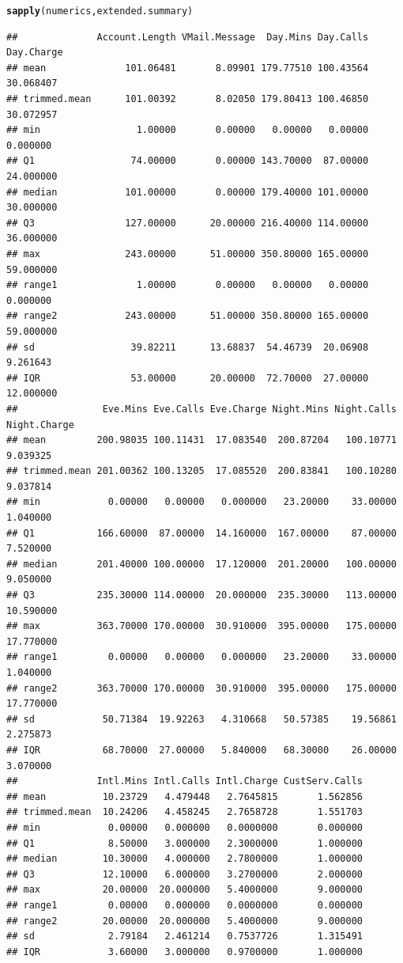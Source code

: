 \documentclass{article}\usepackage[]{graphicx}\usepackage[]{color}
\makeatletter
\newcommand{\hlstd}[1]{\textcolor[rgb]{0.345,0.345,0.345}{#1}}%
\newcommand{\hlkwd}[1]{\textcolor[rgb]{0.737,0.353,0.396}{\textbf{#1}}}%
\newenvironment{kframe}{%
 \def\at@end@of@kframe{}%
 \ifinner\ifhmode%
  \def\at@end@of@kframe{\end{minipage}}%
  \begin{minipage}{\columnwidth}%
 \fi\fi%
 \def\FrameCommand##1{\hskip\@totalleftmargin \hskip-\fboxsep
 \colorbox{shadecolor}{##1}\hskip-\fboxsep
     \hskip-\linewidth \hskip-\@totalleftmargin \hskip\columnwidth}%
 \MakeFramed {\advance\hsize-\width
   \@totalleftmargin\z@ \linewidth\hsize
   \@setminipage}}%
 {\par\unskip\endMakeFramed%
 \at@end@of@kframe}
\newenvironment{knitrout}{}{} %
\makeatother
\begin{document}
\begin{description}
\begin{knitrout}
\begin{kframe}
\begin{alltt}
\hlkwd{sapply}\hlstd{(numerics, extended.summary)}
\end{alltt}
\begin{verbatim}
##              Account.Length VMail.Message  Day.Mins Day.Calls Day.Charge
## mean              101.06481       8.09901 179.77510 100.43564  30.068407
## trimmed.mean      101.00392       8.02050 179.80413 100.46850  30.072957
## min                 1.00000       0.00000   0.00000   0.00000   0.000000
## Q1                 74.00000       0.00000 143.70000  87.00000  24.000000
## median            101.00000       0.00000 179.40000 101.00000  30.000000
## Q3                127.00000      20.00000 216.40000 114.00000  36.000000
## max               243.00000      51.00000 350.80000 165.00000  59.000000
## range1              1.00000       0.00000   0.00000   0.00000   0.000000
## range2            243.00000      51.00000 350.80000 165.00000  59.000000
## sd                 39.82211      13.68837  54.46739  20.06908   9.261643
## IQR                53.00000      20.00000  72.70000  27.00000  12.000000
##               Eve.Mins Eve.Calls Eve.Charge Night.Mins Night.Calls Night.Charge
## mean         200.98035 100.11431  17.083540  200.87204   100.10771     9.039325
## trimmed.mean 201.00362 100.13205  17.085520  200.83841   100.10280     9.037814
## min            0.00000   0.00000   0.000000   23.20000    33.00000     1.040000
## Q1           166.60000  87.00000  14.160000  167.00000    87.00000     7.520000
## median       201.40000 100.00000  17.120000  201.20000   100.00000     9.050000
## Q3           235.30000 114.00000  20.000000  235.30000   113.00000    10.590000
## max          363.70000 170.00000  30.910000  395.00000   175.00000    17.770000
## range1         0.00000   0.00000   0.000000   23.20000    33.00000     1.040000
## range2       363.70000 170.00000  30.910000  395.00000   175.00000    17.770000
## sd            50.71384  19.92263   4.310668   50.57385    19.56861     2.275873
## IQR           68.70000  27.00000   5.840000   68.30000    26.00000     3.070000
##              Intl.Mins Intl.Calls Intl.Charge CustServ.Calls
## mean          10.23729   4.479448   2.7645815       1.562856
## trimmed.mean  10.24206   4.458245   2.7658728       1.551703
## min            0.00000   0.000000   0.0000000       0.000000
## Q1             8.50000   3.000000   2.3000000       1.000000
## median        10.30000   4.000000   2.7800000       1.000000
## Q3            12.10000   6.000000   3.2700000       2.000000
## max           20.00000  20.000000   5.4000000       9.000000
## range1         0.00000   0.000000   0.0000000       0.000000
## range2        20.00000  20.000000   5.4000000       9.000000
## sd             2.79184   2.461214   0.7537726       1.315491
## IQR            3.60000   3.000000   0.9700000       1.000000
\end{verbatim}
\end{kframe}
\end{knitrout}



\end{description}
\end{document}
